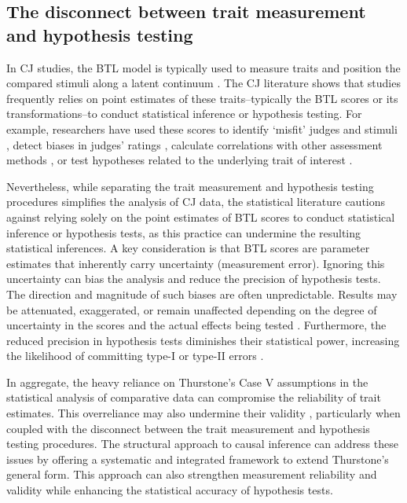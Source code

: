 \documentclass[
  authoryear,
  review,
  1p]{elsarticle}
\begin{document}
\subsection{The disconnect between trait measurement and hypothesis
testing}\label{sec-theory-issue2}

In CJ studies, the BTL model is typically used to measure traits and
position the compared stimuli along a latent continuum
\citep{Thurstone_1927b}. The CJ literature shows that studies frequently
relies on point estimates of these traits--typically the BTL scores or
its transformations--to conduct statistical inference or hypothesis
testing. For example, researchers have used these scores to identify
`misfit' judges and stimuli
\citep{Pollitt_2012b, vanDaal_et_al_2016, Goossens_et_al_2018}, detect
biases in judges' ratings \citep{Pollitt_et_al_2003, Pollitt_2012b},
calculate correlations with other assessment methods
\citep{Goossens_et_al_2018, Bouwer_et_al_2023}, or test hypotheses
related to the underlying trait of interest
\citep{Casalicchio_et_al_2015, Bramley_et_al_2019, Boonen_et_al_2020, Bouwer_et_al_2023, vanDaal_et_al_2017, Jones_et_al_2019, Gijsen_et_al_2021}.

Nevertheless, while separating the trait measurement and hypothesis
testing procedures simplifies the analysis of CJ data, the statistical
literature cautions against relying solely on the point estimates of BTL
scores to conduct statistical inference or hypothesis tests, as this
practice can undermine the resulting statistical inferences. A key
consideration is that BTL scores are parameter estimates that inherently
carry uncertainty (measurement error). Ignoring this uncertainty can
bias the analysis and reduce the precision of hypothesis tests. The
direction and magnitude of such biases are often unpredictable. Results
may be attenuated, exaggerated, or remain unaffected depending on the
degree of uncertainty in the scores and the actual effects being tested
\citep{McElreath_2020, Kline_et_al_2023, Hoyle_et_al_2023}. Furthermore,
the reduced precision in hypothesis tests diminishes their statistical
power, increasing the likelihood of committing type-I or type-II errors
\citep{McElreath_2020}.

In aggregate, the heavy reliance on Thurstone's Case V assumptions in
the statistical analysis of comparative data can compromise the
reliability of trait estimates. This overreliance may also undermine
their validity \citep{Perron_et_al_2015}, particularly when coupled with
the disconnect between the trait measurement and hypothesis testing
procedures. The structural approach to causal inference can address
these issues by offering a systematic and integrated framework to extend
Thurstone's general form. This approach can also strengthen measurement
reliability and validity while enhancing the statistical accuracy of
hypothesis tests.
\end{document}
